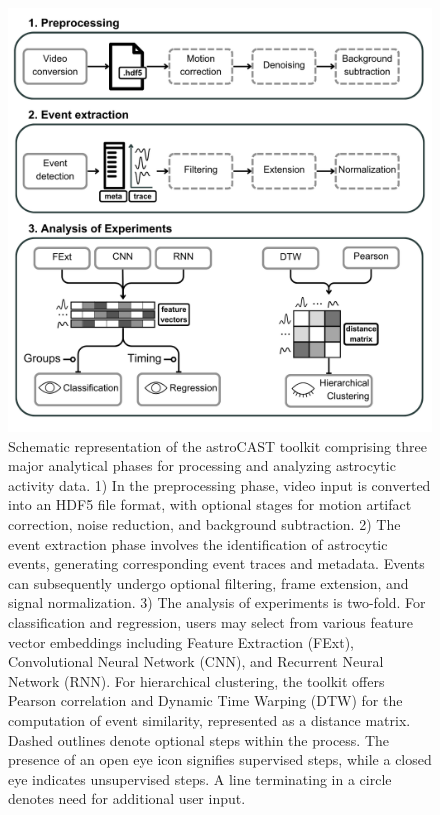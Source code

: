 \begin{figure}[!htb]
\begin{center}
\includegraphics[width=\linewidth]{figures/1.png}
\end{center}
\caption{Schematic representation of the astroCAST toolkit comprising three major analytical phases for processing and analyzing astrocytic activity data. 1) In the preprocessing phase, video input is converted into an HDF5 file format, with optional stages for motion artifact correction, noise reduction, and background subtraction. 2) The event extraction phase involves the identification of astrocytic events, generating corresponding event traces and metadata. Events can subsequently undergo optional filtering, frame extension, and signal normalization. 3) The analysis of experiments is two-fold. For classification and regression, users may select from various feature vector embeddings including Feature Extraction (FExt), Convolutional Neural Network (CNN), and Recurrent Neural Network (RNN). For hierarchical clustering, the toolkit offers Pearson correlation and Dynamic Time Warping (DTW) for the computation of event similarity, represented as a distance matrix. Dashed outlines denote optional steps within the process. The presence of an open eye icon signifies supervised steps, while a closed eye indicates unsupervised steps. A line terminating in a circle denotes need for additional user input.}\label{fig:1}
\end{figure}


